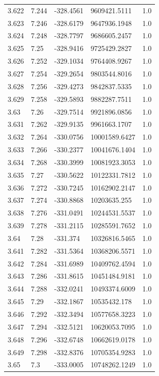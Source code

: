 \begin{tabular}{lllll}
3.622 & 7.244 & -328.4561 & 9609421.5111 & 1.0 \\
3.623 & 7.246 & -328.6179 & 9647936.1948 & 1.0 \\
3.624 & 7.248 & -328.7797 & 9686605.2457 & 1.0 \\
3.625 & 7.25 & -328.9416 & 9725429.2827 & 1.0 \\
3.626 & 7.252 & -329.1034 & 9764408.9267 & 1.0 \\
3.627 & 7.254 & -329.2654 & 9803544.8016 & 1.0 \\
3.628 & 7.256 & -329.4273 & 9842837.5335 & 1.0 \\
3.629 & 7.258 & -329.5893 & 9882287.7511 & 1.0 \\
3.63 & 7.26 & -329.7514 & 9921896.0856 & 1.0 \\
3.631 & 7.262 & -329.9135 & 9961663.1707 & 1.0 \\
3.632 & 7.264 & -330.0756 & 10001589.6427 & 1.0 \\
3.633 & 7.266 & -330.2377 & 10041676.1404 & 1.0 \\
3.634 & 7.268 & -330.3999 & 10081923.3053 & 1.0 \\
3.635 & 7.27 & -330.5622 & 10122331.7812 & 1.0 \\
3.636 & 7.272 & -330.7245 & 10162902.2147 & 1.0 \\
3.637 & 7.274 & -330.8868 & 10203635.255 & 1.0 \\
3.638 & 7.276 & -331.0491 & 10244531.5537 & 1.0 \\
3.639 & 7.278 & -331.2115 & 10285591.7652 & 1.0 \\
3.64 & 7.28 & -331.374 & 10326816.5465 & 1.0 \\
3.641 & 7.282 & -331.5364 & 10368206.5571 & 1.0 \\
3.642 & 7.284 & -331.6989 & 10409762.4594 & 1.0 \\
3.643 & 7.286 & -331.8615 & 10451484.9181 & 1.0 \\
3.644 & 7.288 & -332.0241 & 10493374.6009 & 1.0 \\
3.645 & 7.29 & -332.1867 & 10535432.178 & 1.0 \\
3.646 & 7.292 & -332.3494 & 10577658.3223 & 1.0 \\
3.647 & 7.294 & -332.5121 & 10620053.7095 & 1.0 \\
3.648 & 7.296 & -332.6748 & 10662619.0178 & 1.0 \\
3.649 & 7.298 & -332.8376 & 10705354.9283 & 1.0 \\
3.65 & 7.3 & -333.0005 & 10748262.1249 & 1.0 \\

\end{tabular}
